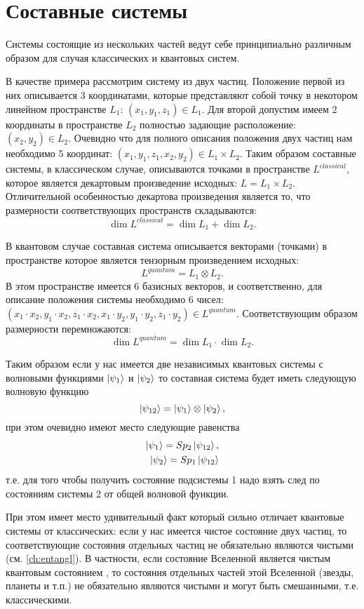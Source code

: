 \section{Составные системы}
\label{sec:add:quantum:composite}
Системы состоящие из нескольких частей ведут себе принципиально
различным образом для случая классических и квантовых систем.


В качестве примера рассмотрим систему из двух частиц. Положение первой
из них описывается 3 координатами, которые представляют собой точку в
некотором линейном пространстве $L_1$: $(x_1, y_1, z_1) \in L_1$. Для второй
допустим имеем 2 координаты в пространстве $L_2$ полностью задающие
расположение:  
$(x_2, y_2) \in L_2$. Очевидно что для полного описания положения двух
частиц нам необходимо 5 координат: $(x_1, y_1, z_1, x_2, y_2) \in L_1
\times L_2$. Таким образом составные системы, в классическом случае,
описываются точками в пространстве $L^{classical}$, которое является декартовым
произведение исходных: $L = L_1 \times L_2$. Отличительной
особенностью декартова произведения является то, что размерности
соответствующих пространств складываются:
\[
\dim{L^{classical}} = \dim{L_1} + \dim{L_2}.
\] 

В квантовом случае составная система описывается векторами (точками) в
пространстве которое является тензорным произведением исходных: 
\[
L^{quantum} = L_1 \otimes L_2.
\]
В этом пространстве имеется 6 базисных векторов, и соответственно, для
описание положения системы необходимо 6 чисел:
$(x_1 \cdot x_2, y_1 \cdot x_2, z_1 \cdot x_2, 
x_1 \cdot y_2, y_1 \cdot y_2, z_1 \cdot y_2) \in L^{quantum}$. 
Соответствующим образом размерности перемножаются:
\[
\dim{L^{quantum}} = \dim{L_1} \cdot \dim{L_2}.
\] 

Таким образом если у нас имеется две независимых квантовых системы с
волновыми функциями $\ket{\psi_1}$ и $\ket{\psi_2}$ то составная
система будет иметь следующую волновую функцию
\[
\ket{\psi_{12}} = \ket{\psi_1} \otimes \ket{\psi_2},
\]
при этом очевидно имеют место следующие равенства 
\begin{eqnarray}
\ket{\psi_1} = Sp_2 \ket{\psi_{12}}, \\
\nonumber
\ket{\psi_2} = Sp_1 \ket{\psi_{12}} 
\nonumber
\end{eqnarray}
т.е. для того чтобы получить состояние подсистемы 1 надо взять след по
состояниям системы 2 от общей волновой функции. 

При этом имеет место удивительный факт который сильно отличает
квантовые системы от классических: если у нас имеется чистое состояние
двух частиц, то соответствующие состояния отдельных частиц не
обязательно являются чистыми (см. \autoref{ch:entangl}). В частности,
если состояние Вселенной является чистым квантовым состоянием
\cite{PhysRevD.28.2960}, то 
состояния отдельных частей этой Вселенной (звезды, планеты и т.п.) не
обязательно являются чистыми и могут быть смешанными, т.е.
классическими. 
